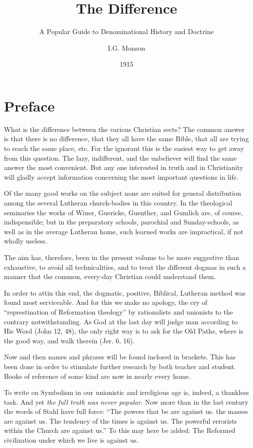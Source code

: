 \documentclass[
]{book}
\title{The Difference}
\subtitle{A Popular Guide to Denominational History and Doctrine}
\author{I.G. Monson}
\date{1915}
\begin{document}
\maketitle

{
\setcounter{tocdepth}{1}
\tableofcontents
}
\chapter*{Preface}\label{preface}

What is the difference between the various Christian sects? The common answer is that there is no difference, that they all have the same Bible, that all are trying to reach the same place, etc. For the ignorant this is the easiest way to get away from this question. The lazy, indifferent, and the unbeliever will find the same answer the most convenient. But any one interested in truth and in Christianity will gladly accept information concerning the most important questions in life.

Of the many good works on the subject none are suited for general distribution among the several Lutheran church-bodies in this country. In the theological seminaries the works of Winer, Guericke, Guenther, and Gumlich are, of course, indispensible; but in the preparatory schools, parochial and Sunday-schools, as well as in the average Lutheran home, such learned works are impractical, if not wholly useless.

The aim has, therefore, been in the present volume to be more suggestive than exhaustive, to avoid all technicalities, and to treat the different dogmas in such a manner that the common, every-day Christian could understand them.

In order to attin this end, the dogmatic, positive, Biblical, Lutheran method was found most serviceable. And for this we make no apology, the cry of ``represtination of Reformation theology'' by rationalists and unionists to the contrary notwithstanding. As God at the last day will judge man according to His Word (John 12, 48), the only right way is to ask for the Old Paths, where is the good way, and walk therein (Jer. 6, 16).

Now and then names and phrases will be found inclosed in brackets. This has been done in order to stimulate further research by both teacher and student. Books of reference of some kind are now in nearly every home.

To write on Symbolism in our unionistic and irreligious age is, indeed, a thankless task. And yet \emph{the full truth was never popular}. Now more than in the last century the words of Stahl have full force: ``The powers that be are against us. the masses are against us. The tendency of the times is against us. The powerful errorists within the Church are against us.'' To this may here be added: The Reformed civilization under which we live is against us.
\end{document}
